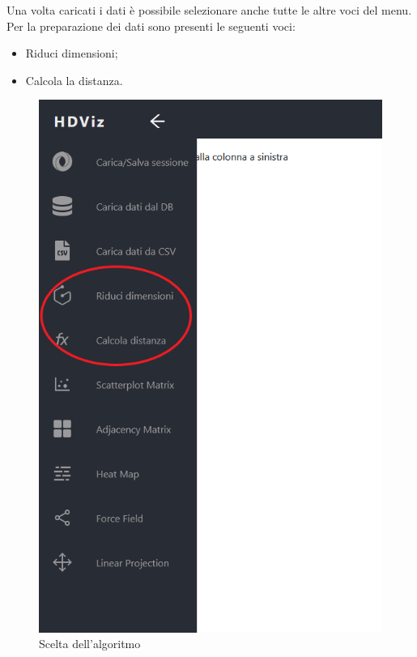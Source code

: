 Una volta caricati i dati è possibile selezionare anche tutte le altre voci del menu. Per la preparazione dei dati sono presenti le seguenti voci:

\begin{itemize}
	\item Riduci dimensioni;
	
	\item Calcola la distanza.
\end{itemize}

\begin{figure}[H]
		\includegraphics[scale=0.4]{Images/SceltaAlgoritmi.png}
		\centering
		\caption{Scelta dell'algoritmo}
\end{figure}

